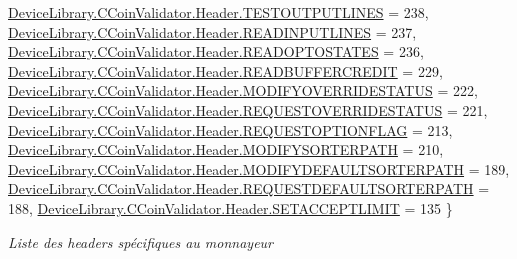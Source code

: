 \begin{DoxyCompactItemize}
\mbox{\hyperlink{group___header_gga5672baec375c16b1ec7bdb4b85cebaa9a684e258f63334d457d2d4c2502820a6e}{Device\+Library.\+C\+Coin\+Validator.\+Header.\+T\+E\+S\+T\+O\+U\+T\+P\+U\+T\+L\+I\+N\+ES}} = 238, 
\newline
\mbox{\hyperlink{group___header_gga5672baec375c16b1ec7bdb4b85cebaa9aa5e7b8fd4be5bf778c447908e8d8008e}{Device\+Library.\+C\+Coin\+Validator.\+Header.\+R\+E\+A\+D\+I\+N\+P\+U\+T\+L\+I\+N\+ES}} = 237, 
\mbox{\hyperlink{group___header_gga5672baec375c16b1ec7bdb4b85cebaa9af7401a2b001f90c26bb2be51b83799b3}{Device\+Library.\+C\+Coin\+Validator.\+Header.\+R\+E\+A\+D\+O\+P\+T\+O\+S\+T\+A\+T\+ES}} = 236, 
\mbox{\hyperlink{group___header_gga5672baec375c16b1ec7bdb4b85cebaa9a492365d426f17a41c4cbd8a9c4846bf9}{Device\+Library.\+C\+Coin\+Validator.\+Header.\+R\+E\+A\+D\+B\+U\+F\+F\+E\+R\+C\+R\+E\+D\+IT}} = 229, 
\mbox{\hyperlink{group___header_gga5672baec375c16b1ec7bdb4b85cebaa9ac95be1f63c78dc1b65f01227ec227359}{Device\+Library.\+C\+Coin\+Validator.\+Header.\+M\+O\+D\+I\+F\+Y\+O\+V\+E\+R\+R\+I\+D\+E\+S\+T\+A\+T\+US}} = 222, 
\newline
\mbox{\hyperlink{group___header_gga5672baec375c16b1ec7bdb4b85cebaa9adbe07970434b8affd947c208a125a2ec}{Device\+Library.\+C\+Coin\+Validator.\+Header.\+R\+E\+Q\+U\+E\+S\+T\+O\+V\+E\+R\+R\+I\+D\+E\+S\+T\+A\+T\+US}} = 221, 
\mbox{\hyperlink{group___header_gga5672baec375c16b1ec7bdb4b85cebaa9a33964bfc1d0f61c0365163eb22258215}{Device\+Library.\+C\+Coin\+Validator.\+Header.\+R\+E\+Q\+U\+E\+S\+T\+O\+P\+T\+I\+O\+N\+F\+L\+AG}} = 213, 
\mbox{\hyperlink{group___header_gga5672baec375c16b1ec7bdb4b85cebaa9ad756e6025d036867d08303eb2f842430}{Device\+Library.\+C\+Coin\+Validator.\+Header.\+M\+O\+D\+I\+F\+Y\+S\+O\+R\+T\+E\+R\+P\+A\+TH}} = 210, 
\mbox{\hyperlink{group___header_gga5672baec375c16b1ec7bdb4b85cebaa9ada6d464dd6ed1209fdad7db02f4d644c}{Device\+Library.\+C\+Coin\+Validator.\+Header.\+M\+O\+D\+I\+F\+Y\+D\+E\+F\+A\+U\+L\+T\+S\+O\+R\+T\+E\+R\+P\+A\+TH}} = 189, 
\newline
\mbox{\hyperlink{group___header_gga5672baec375c16b1ec7bdb4b85cebaa9ad5e22c5779cc7122c156c913d6602b6a}{Device\+Library.\+C\+Coin\+Validator.\+Header.\+R\+E\+Q\+U\+E\+S\+T\+D\+E\+F\+A\+U\+L\+T\+S\+O\+R\+T\+E\+R\+P\+A\+TH}} = 188, 
\mbox{\hyperlink{group___header_gga5672baec375c16b1ec7bdb4b85cebaa9ab6f00a60b1b3cb6b3d3bbe852a099ecc}{Device\+Library.\+C\+Coin\+Validator.\+Header.\+S\+E\+T\+A\+C\+C\+E\+P\+T\+L\+I\+M\+IT}} = 135
 \}
\begin{DoxyCompactList}\small\item\em Liste des headers spécifiques au monnayeur \end{DoxyCompactList}\item 

\end{DoxyCompactItemize}
